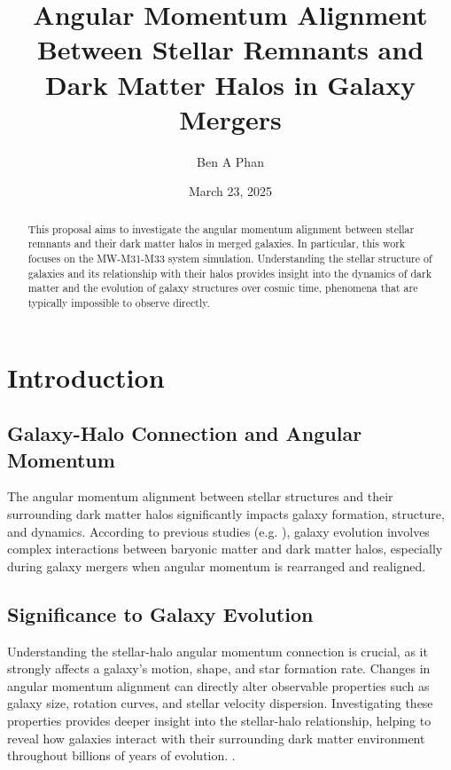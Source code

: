 \documentclass[twocolumn]{aastex631}
\begin{document}
\title{Angular Momentum Alignment Between Stellar Remnants and Dark Matter Halos in Galaxy Mergers}
\author{Ben A Phan}
\date{March 23, 2025}

\begin{abstract}
    This proposal aims to investigate the angular momentum alignment between stellar remnants and their dark matter halos in merged galaxies. In particular, this work focuses on the MW-M31-M33 system simulation. Understanding the stellar structure of galaxies and its relationship with their halos provides insight into the dynamics of dark matter and the evolution of galaxy structures over cosmic time, phenomena that are typically impossible to observe directly. 
\end{abstract}

\section{Introduction}

\subsection{Galaxy-Halo Connection and Angular Momentum}
The angular momentum alignment between stellar structures and their surrounding dark matter halos significantly impacts galaxy formation, structure, and dynamics. According to previous studies (e.g. \cite{Somerville2008, Chua2019, Baptista2023}), galaxy evolution involves complex interactions between baryonic matter and dark matter halos, especially during galaxy mergers when angular momentum is rearranged and realigned.  

\subsection{Significance to Galaxy Evolution}
Understanding the stellar-halo angular momentum connection is crucial, as it strongly affects a galaxy's motion, shape, and star formation rate. Changes in angular momentum alignment can directly alter observable properties such as galaxy size, rotation curves, and stellar velocity dispersion. Investigating these properties provides deeper insight into the stellar-halo relationship, helping to reveal how galaxies interact with their surrounding dark matter environment throughout billions of years of evolution.
 \citep{Chua2019, Baptista2023}.
\end{document}
